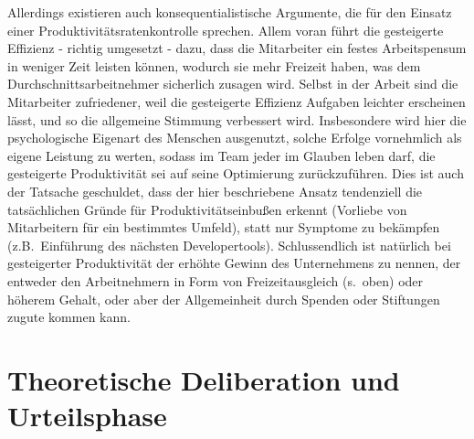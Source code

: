 \documentclass[a4paper,12pt,]{article}
\begin{document}
Allerdings existieren auch konsequentialistische Argumente, die für den Einsatz einer Produktivitätsratenkontrolle sprechen. Allem voran führt die gesteigerte Effizienz - richtig umgesetzt - dazu, dass die Mitarbeiter ein festes Arbeitspensum in weniger Zeit leisten können, wodurch sie mehr Freizeit haben, was dem Durchschnittsarbeitnehmer sicherlich zusagen wird. Selbst in der Arbeit sind die Mitarbeiter zufriedener, weil die gesteigerte Effizienz Aufgaben leichter erscheinen lässt, und so die allgemeine Stimmung verbessert wird. Insbesondere wird hier die psychologische Eigenart des Menschen ausgenutzt, solche Erfolge vornehmlich als eigene Leistung zu werten, sodass im Team jeder im Glauben leben darf, die gesteigerte Produktivität sei auf seine Optimierung zurückzuführen. Dies ist auch der Tatsache geschuldet, dass der hier beschriebene Ansatz tendenziell die tatsächlichen Gründe für Produktivitätseinbußen erkennt (Vorliebe von Mitarbeitern für ein bestimmtes Umfeld), statt nur Symptome zu bekämpfen (z.B.~Einführung des nächsten Developertools). Schlussendlich ist natürlich bei gesteigerter Produktivität der erhöhte Gewinn des Unternehmens zu nennen, der entweder den Arbeitnehmern in Form von Freizeitausgleich (s.~oben) oder höherem Gehalt, oder aber der Allgemeinheit durch Spenden oder Stiftungen zugute kommen kann.


\section{Theoretische Deliberation und Urteilsphase}
\end{document}
